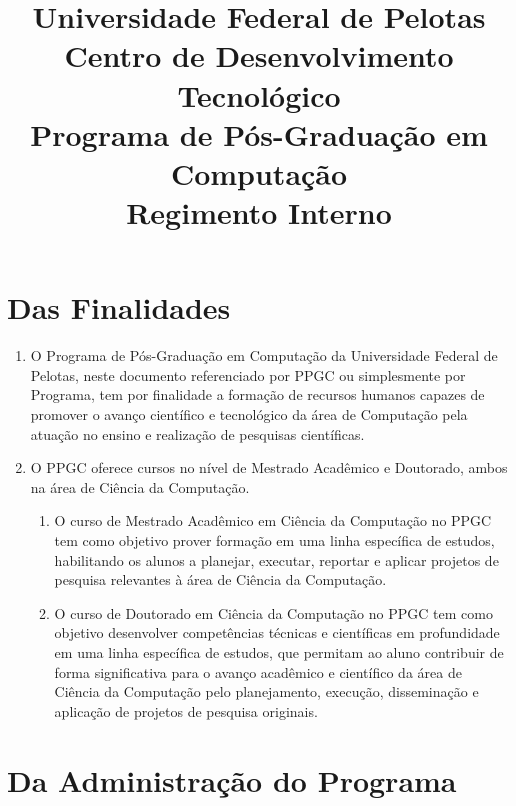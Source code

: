 \documentclass{article}
\title{\large{Universidade Federal de Pelotas}\\Centro de Desenvolvimento Tecnológico\\Programa de Pós-Graduação em Computação\\\vspace{5mm}\Large{\textbf{Regimento Interno}}}
\date{}
\begin{document}
\maketitle

\vspace{-10mm}

\tableofcontents


\section{Das Finalidades}

\begin{enumerate}
\item O Programa de Pós-Graduação em Computação da Universidade Federal de Pelotas, neste documento referenciado por PPGC ou simplesmente por Programa, tem por finalidade a formação de recursos humanos capazes de promover o avanço científico e tecnológico da área de Computação pela atuação no ensino e realização de pesquisas científicas.

\item O PPGC oferece cursos no nível de Mestrado Acadêmico e Doutorado, ambos na área de Ciência da Computação.
\begin{enumerate}
	\item O curso de Mestrado Acadêmico em Ciência da Computação no PPGC tem como objetivo prover formação em uma linha específica de estudos, habilitando os alunos a planejar, executar, reportar e aplicar projetos de pesquisa relevantes à área de Ciência da Computação.

	\item O curso de Doutorado em Ciência da Computação no PPGC tem como objetivo desenvolver competências técnicas e científicas em profundidade em uma linha específica de estudos, que permitam ao aluno contribuir de forma significativa para o avanço acadêmico e científico da área de Ciência da Computação pelo planejamento, execução, disseminação e aplicação de projetos de pesquisa originais.

\end{enumerate}

\end{enumerate}

\section{Da Administração do Programa}
\end{document}
